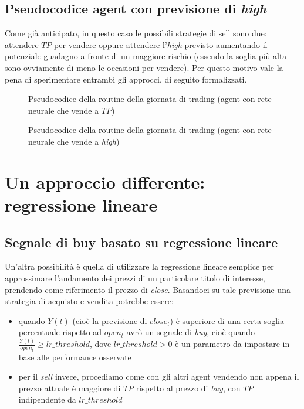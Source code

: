 \documentclass[binding=0.6cm]{sapthesis}
\begin{document}
		\section{Pseudocodice agent con previsione di \textit{high}}
			Come già anticipato, in questo caso le possibili strategie di sell sono due: attendere $TP$ per vendere oppure attendere l'\textit{high} previsto aumentando il potenziale guadagno a fronte
			di un maggiore rischio (essendo la soglia più alta sono ovviamente di meno le occasioni per vendere). Per questo motivo vale la pena di sperimentare entrambi gli approcci, di
			seguito formalizzati.
			\begin{figure}[H]
			{
				\begin{codebox}
				\end{codebox}
				\caption{Pseudocodice della routine della giornata di trading (agent con rete neurale che vende a $TP$)}
			}
			\end{figure}
			\begin{figure}[H]
			{
				\begin{codebox}
					\VerbatimInput{assets/agents/nn_ta_h.s}
				\end{codebox}
				\caption{Pseudocodice della routine della giornata di trading (agent con rete neurale che vende a \textit{high})}
			}
			\end{figure}
	\chapter{Un approccio differente: regressione lineare}
		\section{Segnale di buy basato su regressione lineare}
			Un'altra possibilità è quella di utilizzare la regressione lineare semplice per approssimare l'andamento dei prezzi di un particolare titolo di interesse, prendendo come riferimento il prezzo di
			\textit{close}. Basandoci su tale previsione una strategia di acquisto e vendita potrebbe essere:
			\begin{itemize}
				\item quando $Y(t)$ (cioè la previsione di $close_t$) è superiore di una certa soglia percentuale rispetto ad $open_{t}$ avrò un segnale di \textit{buy}, cioè quando \\
					$\frac{Y(t)}{open_t} \geq lr\_threshold$, dove $lr\_threshold > 0$ è un parametro da impostare in base alle performance osservate
				\item per il \textit{sell} invece, procediamo come con gli altri agent vendendo non appena il prezzo attuale è maggiore di $TP$ rispetto al prezzo di \textit{buy}, con $TP$ indipendente da
					$lr\_threshold$
			\end{itemize}
		\newpage
\end{document}
